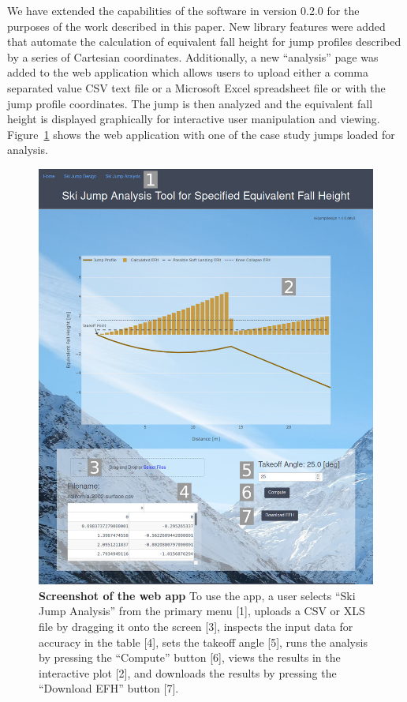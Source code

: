 \documentclass{article}
\begin{document}
We have extended the capabilities of the software in version 0.2.0 for the
purposes of the work described in this paper. New library features were added
that automate the calculation of equivalent fall height for jump profiles
described by a series of Cartesian coordinates.
Additionally, a new
``analysis'' page was added to the web application which allows users to upload
either a comma separated value CSV text file or a Microsoft Excel spreadsheet
file or with the jump profile coordinates. The jump is then analyzed and the
equivalent fall height is displayed graphically for interactive user
manipulation and viewing. Figure~\ref{fig:web-app-screenshot} shows the web
application with one of the case study jumps loaded for analysis.
%
\begin{figure}
  \centering
  \includegraphics[width=5.00in]{figures/web-app-screenshot.png}
  \caption{\textbf{Screenshot of the web app} To use the app, a user selects
    ``Ski Jump Analysis'' from the primary menu [1], uploads a CSV or XLS file
    by dragging it onto the screen [3], inspects the input data for accuracy in
    the table [4], sets the takeoff angle [5], runs the analysis by pressing
    the ``Compute'' button [6], views the results in the interactive plot [2],
    and downloads the results by pressing the ``Download EFH'' button [7].}
  \label{fig:web-app-screenshot}
\end{figure}
\end{document}
